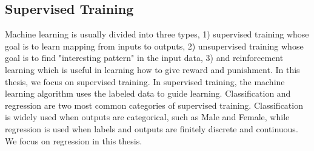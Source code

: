 \documentclass[12pt,a4paper,english
]{tunithesis}
\begin{document}
\subsection{Supervised Training}
Machine learning is usually divided into three types, 1) supervised training whose goal is to learn mapping from inputs to outputs, 2) unsupervised training whose goal is to find "interesting pattern" in the input data, 3) and reinforcement learning which is useful in learning how to give reward and punishment. In this thesis, we focus on supervised training.
In supervised training, the machine learning algorithm uses the labeled data to guide learning. Classification and regression are two most common categories of supervised training. Classification is widely used when outputs are categorical, such as Male and Female, while regression is used when labels and outputs are finitely discrete and continuous. We focus on regression in this thesis. 
\end{document}
